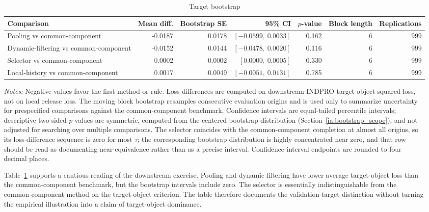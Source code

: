 \documentclass[a4paper,12pt]{article}
\newcommand{\1}{\mathbf{1}}
\newcommand{\ExhibitNote}[1]{\begin{minipage}{0.94\textwidth}\footnotesize\emph{Notes:} #1\end{minipage}}
\begin{document}
\begin{table}[H]
\centering
\caption{Target bootstrap}
\label{tab:ia_bootstrap_target}
\small
\begin{adjustbox}{max width=\textwidth}
\begin{tabular}{@{}lrrrrrr@{}}
\toprule
Comparison & Mean diff. & Bootstrap SE & 95\% CI & $p$-value & Block length & Replications \\
\midrule
Pooling vs common-component & -0.0187 & 0.0178 & $[-0.0599,\ 0.0033]$ & 0.162 & 6 & 999 \\
Dynamic-filtering vs common-component & -0.0152 & 0.0144 & $[-0.0478,\ 0.0020]$ & 0.116 & 6 & 999 \\
Selector vs common-component & 0.0002 & 0.0002 & $[0.0000,\ 0.0005]$ & 0.330 & 6 & 999 \\
Local-history vs common-component & 0.0017 & 0.0049 & $[-0.0051,\ 0.0131]$ & 0.785 & 6 & 999 \\
\bottomrule
\end{tabular}
\end{adjustbox}
\par\medskip
\ExhibitNote{Negative values favor the first method or rule. Loss differences are computed on downstream INDPRO target-object squared loss, not on local release loss. The moving block bootstrap resamples consecutive evaluation origins and is used only to summarize uncertainty for prespecified comparisons against the common-component benchmark. Confidence intervals are equal-tailed percentile intervals; descriptive two-sided $p$-values are symmetric, computed from the centered bootstrap distribution (Section~\ref{ia:bootstrap_scope}), and not adjusted for searching over multiple comparisons. The selector coincides with the common-component completion at almost all origins, so its loss-difference sequence is zero for most $\tau$; the corresponding bootstrap distribution is highly concentrated near zero, and that row should be read as documenting near-equivalence rather than as a precise interval. Confidence-interval endpoints are rounded to four decimal places.}
\end{table}

Table~\ref{tab:ia_bootstrap_target} supports a cautious reading of the downstream exercise. Pooling and dynamic filtering have lower average target-object loss than the common-component benchmark, but the bootstrap intervals include zero. The selector is essentially indistinguishable from the common-component method on the target-object criterion. The table therefore documents the validation-target distinction without turning the empirical illustration into a claim of target-object dominance.
\end{document}
